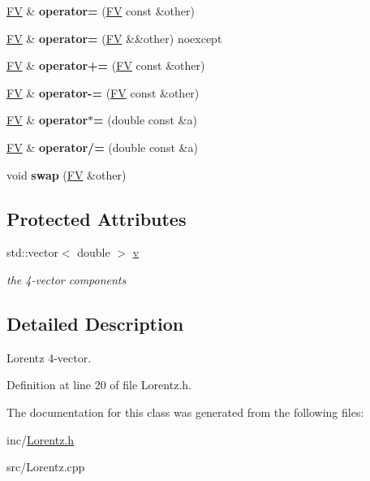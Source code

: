 \begin{DoxyCompactItemize}
\item 
\hypertarget{classFV_aa7bad77e8a25ff4d3d769a544eccf314}{\hyperlink{classFV}{F\-V} \& {\bfseries operator=} (\hyperlink{classFV}{F\-V} const \&other)}\label{classFV_aa7bad77e8a25ff4d3d769a544eccf314}

\item 
\hypertarget{classFV_ac95050de7df77088ad31b1c755e2fe33}{\hyperlink{classFV}{F\-V} \& {\bfseries operator=} (\hyperlink{classFV}{F\-V} \&\&other) noexcept}\label{classFV_ac95050de7df77088ad31b1c755e2fe33}

\item 
\hypertarget{classFV_ac30a0c8c757d2e5dbd74131f569f48db}{\hyperlink{classFV}{F\-V} \& {\bfseries operator+=} (\hyperlink{classFV}{F\-V} const \&other)}\label{classFV_ac30a0c8c757d2e5dbd74131f569f48db}

\item 
\hypertarget{classFV_a32a55d4f37e616b0b043282a201aa0f6}{\hyperlink{classFV}{F\-V} \& {\bfseries operator-\/=} (\hyperlink{classFV}{F\-V} const \&other)}\label{classFV_a32a55d4f37e616b0b043282a201aa0f6}

\item 
\hypertarget{classFV_ac50969de8023081218ac2480f4403a4d}{\hyperlink{classFV}{F\-V} \& {\bfseries operator$\ast$=} (double const \&a)}\label{classFV_ac50969de8023081218ac2480f4403a4d}

\item 
\hypertarget{classFV_a8d74f60b130edb26fd62c590ea5ecfce}{\hyperlink{classFV}{F\-V} \& {\bfseries operator/=} (double const \&a)}\label{classFV_a8d74f60b130edb26fd62c590ea5ecfce}

\item 
\hypertarget{classFV_a4e403b1c96be31cc1572c399a61d5933}{void {\bfseries swap} (\hyperlink{classFV}{F\-V} \&other)}\label{classFV_a4e403b1c96be31cc1572c399a61d5933}

\end{DoxyCompactItemize}
\subsection*{Protected Attributes}
\begin{DoxyCompactItemize}
\item 
\hypertarget{classFV_a3bd5ca0ce4ba350f0c2a177f196419df}{std\-::vector$<$ double $>$ \hyperlink{classFV_a3bd5ca0ce4ba350f0c2a177f196419df}{v}}\label{classFV_a3bd5ca0ce4ba350f0c2a177f196419df}

\begin{DoxyCompactList}\small\item\em the 4-\/vector components \end{DoxyCompactList}\end{DoxyCompactItemize}


\subsection{Detailed Description}
Lorentz 4-\/vector. 

Definition at line 20 of file Lorentz.\-h.



The documentation for this class was generated from the following files\-:\begin{DoxyCompactItemize}
\item 
inc/\hyperlink{Lorentz_8h}{Lorentz.\-h}\item 
src/Lorentz.\-cpp\end{DoxyCompactItemize}

